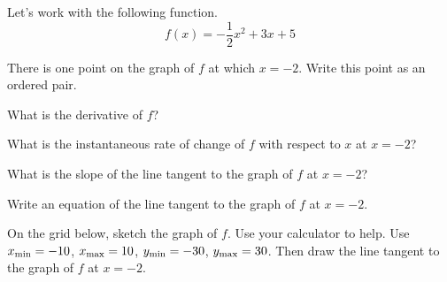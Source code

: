 
Let's work with the following function.
\begin{equation*}
 f(x) = - \frac{1}{2} x^2 + 3x + 5
\end{equation*}
\begin{ProblemSet}
 \begin{Problem}
  There is one point on the graph of $f$ at which $x = -2$.
  Write this point as an ordered pair.
 \end{Problem}
 \begin{Problem}
  What is the derivative of $f$?
 \end{Problem}
 \begin{Problem}
  What is the instantaneous rate of change of $f$ with respect to $x$ at $x = -2$?
 \end{Problem}
 \begin{Problem}
  What is the slope of the line tangent to the graph of $f$ at $x = -2$?
 \end{Problem}
 \begin{Problem}[pencil space=2.5in]
  Write an equation of the line tangent to the graph of $f$ at $x = -2$.
 \end{Problem}
 \begin{Problem}
  On the grid below, sketch the graph of $f$.
  Use your calculator to help.
  Use $x_\mathrm{min} = -10$, $x_\mathrm{max} = 10$, $y_\mathrm{min} = -30$, $y_\mathrm{max} = 30$.
  Then draw the line tangent to the graph of $f$ at $x = -2$.

  \bigskip
  \GraphingGridMedium
 \end{Problem}
\end{ProblemSet}

